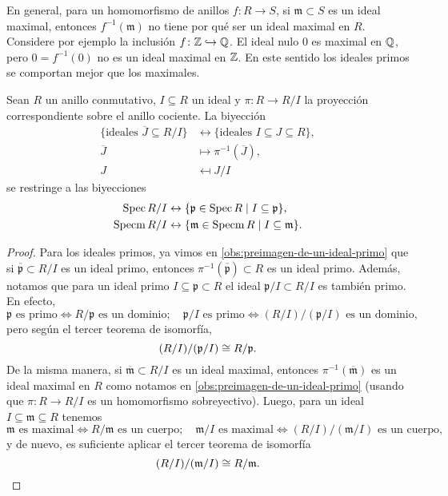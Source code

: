 \begin{comentario}
  En general, para un homomorfismo de anillos $f\colon R\to S$,
  si $\mathfrak{m} \subset S$ es un ideal maximal, entonces
  $f^{-1} (\mathfrak{m})$ no tiene por qué ser un ideal maximal en
  $R$. Considere por ejemplo la inclusión $f\colon \mathbb{Z} \hookrightarrow \mathbb{Q}$.
  El ideal nulo $0$ es maximal en $\mathbb{Q}$, pero $0 = f^{-1} (0)$ no es un ideal
  maximal en $\mathbb{Z}$. En este sentido los ideales primos se comportan mejor que
  los maximales.
\end{comentario}

\begin{proposicion}
  \label{prop:ideales-primos-y-maximales-en-el-cociente}
  Sean $R$ un anillo conmutativo, $I \subseteq R$ un ideal y
  $\pi\colon R\to R/I$ la proyección correspondiente sobre el anillo
  cociente. La biyección
  \begin{align*}
    \{ \text{ideales }\overline{J} \subseteq R/I \} & \leftrightarrow
    \{ \text{ideales }I \subseteq J \subseteq R \},\\
    \overline{J} & \mapsto \pi^{-1} (\overline{J}),\\
    J & \mapsfrom J/I
  \end{align*}
  se restringe a las biyecciones
  \begin{align*}
    \operatorname{Spec} R/I & \leftrightarrow
    \{ \mathfrak{p} \in \operatorname{Spec} R \mid I \subseteq \mathfrak{p} \},\\
    \operatorname{Specm} R/I & \leftrightarrow
    \{ \mathfrak{m} \in \operatorname{Specm} R \mid I \subseteq \mathfrak{m} \}.
  \end{align*}

  \begin{proof}
    Para los ideales primos, ya vimos en \ref{obs:preimagen-de-un-ideal-primo}
    que si $\overline{\mathfrak{p}} \subset R/I$ es un ideal primo, entonces
    $\pi^{-1} (\overline{\mathfrak{p}}) \subset R$ es un ideal primo. Además,
    notamos que para un ideal primo $I \subseteq \mathfrak{p} \subset R$ el
    ideal $\mathfrak{p}/I \subset R/I$ es también primo. En efecto,
    \[ \mathfrak{p} \text{ es primo} \iff
       R/\mathfrak{p} \text{ es un dominio}; \quad
       \mathfrak{p}/I \text{ es primo} \iff
       (R/I)/(\mathfrak{p}/I) \text{ es un dominio}, \]
    pero según el tercer teorema de isomorfía,
    $$(R/I)/(\mathfrak{p}/I) \cong R/\mathfrak{p}.$$
    De la misma manera, si $\overline{\mathfrak{m}} \subset R/I$ es un ideal
    maximal, entonces $\pi^{-1} (\overline{\mathfrak{m}})$ es un ideal maximal
    en $R$ como notamos en \ref{obs:preimagen-de-un-ideal-primo} (usando que
    $\pi\colon R\to R/I$ es un homomorfismo sobreyectivo). Luego, para un ideal
    $I \subseteq \mathfrak{m} \subseteq R$ tenemos
    \[ \mathfrak{m} \text{ es maximal} \iff
       R/\mathfrak{m} \text{ es un cuerpo};
       \quad
       \mathfrak{m}/I \text{ es maximal} \iff
       (R/I)/(\mathfrak{m}/I) \text{ es un cuerpo}, \]
    y de nuevo, es suficiente aplicar el tercer teorema de isomorfía
    \[ (R/I)/(\mathfrak{m}/I) \cong R/\mathfrak{m}. \qedhere \]
  \end{proof}
\end{proposicion}

